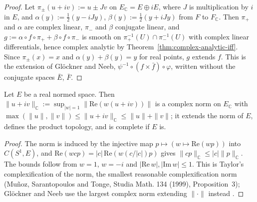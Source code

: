 \begin{proof}
  \leanok
  Let $\pi_\pm(u + iv) := u \pm J v$ on $E_{\mathbb{C}} = E \oplus iE$, where $J$ is
  multiplication by $i$ in $E$, and $\alpha(y) := \frac12 (y - i J y)$,
  $\beta(y) := \frac12 (y + i J y)$ from $F$ to $F_{\mathbb{C}}$. Then $\pi_+$ and $\alpha$ are
  complex linear, $\pi_-$ and $\beta$ conjugate linear, and
  $g := \alpha \circ f \circ \pi_+ + \beta \circ f \circ \pi_-$ is smooth on
  $\pi_+^{-1}(U) \cap \pi_-^{-1}(U)$ with complex linear differentials, hence complex analytic
  by Theorem~\ref{thm:complex-analytic-iff}. Since $\pi_\pm(x) = x$ and
  $\alpha(y) + \beta(y) = y$ for real points, $g$ extends $f$. This is the extension of Glöckner
  and Neeb, $\psi^{-1} \circ (f \times \bar f) \circ \varphi$, written without the conjugate
  spaces $\bar E$, $\bar F$.
\end{proof}

\begin{lemma}
  \label{lem:normed-complexification}
  \leanok
  Let $E$ be a real normed space. Then
  $\|u + iv\|_{\mathbb{C}} := \sup_{|w| = 1} \|\mathrm{Re}(w(u + iv))\|$ is a complex norm on
  $E_{\mathbb{C}}$ with $\max(\|u\|, \|v\|) \le \|u + iv\|_{\mathbb{C}} \le \|u\| + \|v\|$; it
  extends the norm of $E$, defines the product topology, and is complete if $E$ is.
\end{lemma}

\begin{proof}
  \leanok
  The norm is induced by the injective map $p \mapsto (w \mapsto \mathrm{Re}(wp))$ into
  $C(S^1, E)$, and $\mathrm{Re}(w c p) = |c| \,\mathrm{Re}(w (c/|c|) p)$ gives
  $\|cp\|_{\mathbb{C}} \le |c| \|p\|_{\mathbb{C}}$. The bounds follow from $w = 1$, $w = -i$ and
  $|\mathrm{Re}\,w|, |\mathrm{Im}\,w| \le 1$. This is Taylor's complexification of the norm,
  the smallest reasonable complexification norm (Muñoz, Sarantopoulos and Tonge, Studia Math.
  134 (1999), Proposition~3);
  Glöckner and Neeb use the largest complex norm extending $\|\cdot\|$ instead
  \cite[Exercise~2.3.7]{GN26}.
\end{proof}

